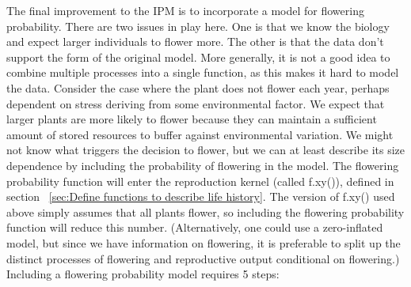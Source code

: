 \documentclass[11pt]{article}
\begin{document}
The final improvement to the IPM is to incorporate a model for flowering probability. There are two issues in play here. One is that we know the biology and expect larger individuals to flower more. The other is that the data don't support the form of the original model. More generally, it is not a good idea to combine multiple processes into a single function, as this makes it hard to model the data. Consider the case where the plant does not flower each year, perhaps dependent on stress deriving from some environmental factor. We expect that larger plants are more likely to flower because they can maintain a sufficient amount of stored resources to buffer against environmental variation. We might not know what triggers the decision to flower, but we can at least describe its size dependence by including the probability of flowering in the model. The flowering probability function will enter the reproduction kernel (called f.xy()), defined in section ~\ref{sec:Define functions to describe life history}. The version of f.xy() used above simply assumes that all plants flower, so including the flowering probability function will reduce this number. (Alternatively, one could use a zero-inflated model, but since we have information on flowering, it is preferable to split up the distinct processes of flowering and reproductive output conditional on flowering.)  Including a flowering probability model requires 5 steps:
	 
\end{document}
